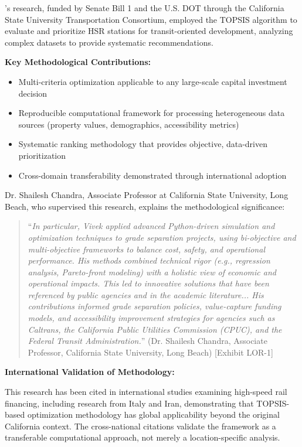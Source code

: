 \dr's research, funded by Senate Bill 1 and the U.S. DOT through the California State University Transportation Consortium, employed the TOPSIS algorithm to evaluate and prioritize HSR stations for transit-oriented development, analyzing complex datasets to provide systematic recommendations.

\textbf{Key Methodological Contributions:}
\begin{itemize}
    \item Multi-criteria optimization applicable to any large-scale capital investment decision
    \item Reproducible computational framework for processing heterogeneous data sources (property values, demographics, accessibility metrics)
    \item Systematic ranking methodology that provides objective, data-driven prioritization
    \item Cross-domain transferability demonstrated through international adoption
\end{itemize}

Dr. Shailesh Chandra, Associate Professor at California State University, Long Beach, who supervised this research, explains the methodological significance:

\begin{quote}
``\textit{In particular, Vivek applied advanced Python-driven simulation and optimization techniques to grade separation projects, using bi-objective and multi-objective frameworks to balance cost, safety, and operational performance. His methods combined technical rigor (e.g., regression analysis, Pareto-front modeling) with a holistic view of economic and operational impacts. This led to innovative solutions that have been referenced by public agencies and in the academic literature... His contributions informed grade separation policies, value-capture funding models, and accessibility improvement strategies for agencies such as Caltrans, the California Public Utilities Commission (CPUC), and the Federal Transit Administration.}'' (Dr. Shailesh Chandra, Associate Professor, California State University, Long Beach) [Exhibit LOR-1]
\end{quote}

\textbf{International Validation of Methodology:}

This research has been cited in international studies examining high-speed rail financing, including research from Italy and Iran, demonstrating that \drs TOPSIS-based optimization methodology has global applicability beyond the original California context. The cross-national citations validate the framework as a transferable computational approach, not merely a location-specific analysis.

